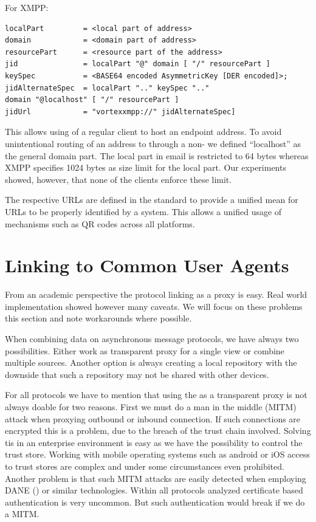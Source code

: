 For XMPP:
\begin{lstlisting}[language=EBNF]
localPart         = <local part of address>
domain            = <domain part of address>
resourcePart      = <resource part of the address>
jid               = localPart "@" domain [ "/" resourcePart ]
keySpec           = <BASE64 encoded AsymmetricKey [DER encoded]>;
jidAlternateSpec  = localPart ".." keySpec ".." 
domain "@localhost" [ "/" resourcePart ]
jidUrl            = "vortexxmpp://" jidAlternateSpec]
\end{lstlisting}

This allows using of a regular client to host an \VortexMessage{} endpoint address. To avoid unintentional routing of an address to through a non-\VortexNode{} we defined ``localhost'' as the general domain part. The local part in email is restricted to 64 bytes whereas XMPP specifies 1024 bytes as size limit for the local part. Our experiments showed, however, that none of the clients enforce these limit.

The respective URLs are defined in the standard to provide a unified mean for URLs to be properly identified by a system. This allows a unified usage of mechanisms such as QR codes across all platforms.

\section{Linking to Common User Agents}
From an academic perspective the protocol linking as a proxy is easy. Real world implementation showed however many caveats. We will focus on these problems this section and note workarounds where possible.

When combining data on asynchronous message protocols, we have always two possibilities. Either work as transparent proxy for a single view or combine multiple sources. Another option is always creating a local repository with the downside that such a repository may not be shared with other devices.

For all protocols we have to mention that using the \VortexNode as a transparent proxy is not always doable for two reasons. First we must do a man in the middle (MITM) attack when proxying outbound or inbound connection. If such connections are encrypted this is a problem, due to the breach of the trust chain involved. Solving tis in an enterprise environment is easy as we have the possibility to control the trust store. Working with mobile operating systems such as android or iOS access to trust stores are complex and under some circumstances even prohibited. Another problem is that such MITM attacks are easily detected when employing DANE (\cite{rfc6698,rfc7672}) or similar technologies. Within all protocols analyzed certificate based authentication is very uncommon. But such authentication would break if we do a MITM.

